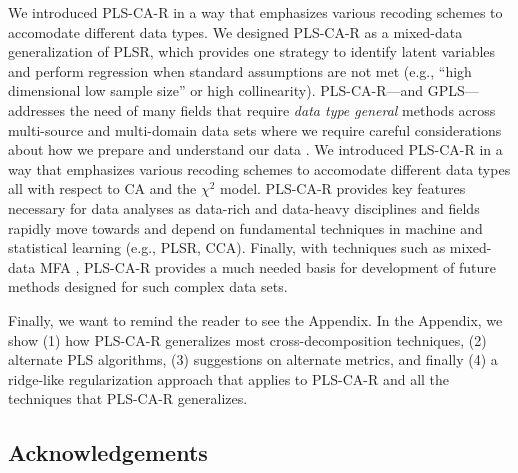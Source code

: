 \documentclass[12pt]{article}
\begin{document}
We introduced PLS-CA-R in a way that emphasizes various recoding schemes
to accomodate different data types. We designed PLS-CA-R as a mixed-data
generalization of PLSR, which provides one strategy to identify latent
variables and perform regression when standard assumptions are not met
(e.g., ``high dimensional low sample size'' or high collinearity).
PLS-CA-R---and GPLS---addresses the need of many fields that require
\textit{data type general} methods across multi-source and multi-domain
data sets where we require careful considerations about how we prepare
and understand our data \citep{nguyen2019ten}. We introduced PLS-CA-R in
a way that emphasizes various recoding schemes to accomodate different
data types all with respect to CA and the \(\chi^2\) model. PLS-CA-R
provides key features necessary for data analyses as data-rich and
data-heavy disciplines and fields rapidly move towards and depend on
fundamental techniques in machine and statistical learning (e.g., PLSR,
CCA). Finally, with techniques such as mixed-data MFA
\citep{becue-bertaut_multiple_2008}, PLS-CA-R provides a much needed
basis for development of future methods designed for such complex data
sets.

Finally, we want to remind the reader to see the Appendix. In the
Appendix, we show (1) how PLS-CA-R generalizes most cross-decomposition
techniques, (2) alternate PLS algorithms, (3) suggestions on alternate
metrics, and finally (4) a ridge-like regularization approach that
applies to PLS-CA-R and all the techniques that PLS-CA-R generalizes.

\hypertarget{acknowledgements}{%
\subsection{Acknowledgements}\label{acknowledgements}}
\end{document}
